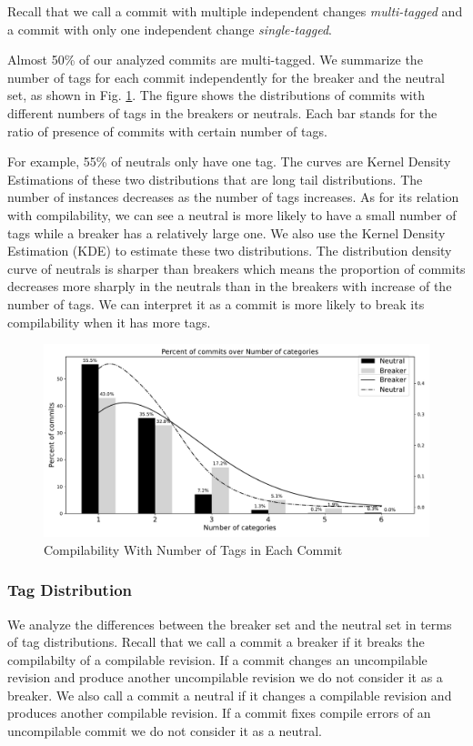 Recall that we call a commit with multiple independent changes \textit{multi-tagged} and a commit with only one independent change \textit{single-tagged}.

Almost 50\% of our analyzed commits are multi-tagged.
We summarize the number of tags for each commit independently for the breaker and the neutral set, as shown in Fig. \ref{fig:num_tasks_fig}. 
The figure shows the distributions of commits with different numbers of tags in the breaker{}s or neutral{}s. 
Each bar stands for the ratio of presence of commits with certain number of tags.

For example, 55\% of neutral{}s only have one tag. 
The curves are Kernel Density Estimations of these two distributions that are long tail distributions. 
The number of instances decreases as the number of tags increases.
As for its relation with compilability, we can see a neutral is more likely to have a small number of tags while a breaker has a relatively large one. 
We also use the Kernel Density Estimation (KDE) to estimate these two distributions. 
The distribution density curve of neutral{}s is sharper than breaker{}s which means the proportion of commits decreases more sharply in the neutral{}s than in the breaker{}s with increase of the number of tags. 
We can interpret it as a commit is more likely to break its compilability when it has more tags.

\begin{figure}[htbp]
\centerline{\includegraphics[scale=0.6]{figures/num_tasks_break_rate.pdf}}
\caption{Compilability With Number of Tags in Each Commit}
\label{fig:num_tasks_fig}
\end{figure}



\subsubsection{Tag Distribution}
We analyze the differences between the breaker set and the neutral set in terms of tag distributions.
Recall that we call a commit a breaker if it breaks the compilabilty of a compilable revision.
If a commit changes an uncompilable revision and produce another uncompilable revision we do not consider it as a breaker.
We also call a commit a neutral if it changes a compilable revision and produces another compilable revision.
If a commit fixes compile errors of an uncompilable commit we do not consider it as a neutral.

